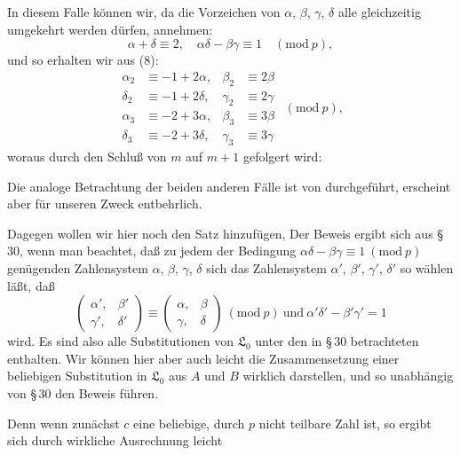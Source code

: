 
In diesem Falle können wir, da die Vorzeichen von $\alpha$, $\beta$,
$\gamma$, $\delta$ alle gleichzeitig umgekehrt werden dürfen, annehmen:
\[
\alpha+\delta\equiv 2, \quad \alpha\delta-\beta\gamma\equiv 1 \quad (\mathrm{mod}\ p),
\]
und so erhalten wir aus (8):
\[
\begin{aligned}
\alpha_2 &\equiv -1+2\alpha, & \beta_2 &\equiv 2\beta\\
\delta_2 &\equiv -1+2\delta, & \gamma_2 &\equiv 2\gamma\\
\alpha_3 &\equiv -2+3\alpha, & \beta_3 &\equiv 3\beta\\
\delta_3 &\equiv -2+3\delta, & \gamma_3 &\equiv 3\gamma
\end{aligned}\ \ (\mathrm{mod}\ p),
\]
woraus durch den Schluß von $m$ auf $m+1$ gefolgert wird:

Die analoge Betrachtung der beiden anderen Fälle ist von
 durchgeführt, erscheint aber für unseren Zweck entbehrlich.

Dagegen wollen wir hier noch den Satz hinzufügen, 
Der Beweis ergibt sich aus \S\,30, wenn man beachtet, daß
zu jedem der Bedingung $\alpha\delta-\beta\gamma\equiv 1\ (\mathrm{mod}\ p)$ genügenden
Zahlensystem $\alpha$, $\beta$, $\gamma$, $\delta$ sich das Zahlensystem $\alpha'$, $\beta'$, $\gamma'$, $\delta'$ so
wählen läßt, daß
\[
\begin{pmatrix}\alpha', & \beta'\\ \gamma', & \delta'\end{pmatrix} \equiv \begin{pmatrix}\alpha, & \beta\\ \gamma, & \delta\end{pmatrix}\ (\mathrm{mod}\ p) \ \text{und}\ \alpha'\delta'-\beta'\gamma'=1
\]
wird. Es sind also alle Substitutionen von $\mathfrak{L}_0$ unter den in \S\,30
betrachteten enthalten. Wir können hier aber auch leicht die
Zusammensetzung einer beliebigen Substitution in $\mathfrak{L}_0$ aus $A$ und
$B$ wirklich darstellen, und so unabhängig von \S\,30 den Beweis
führen.

Denn wenn zunächst $c$ eine beliebige, durch $p$ nicht teilbare
Zahl ist, so ergibt sich durch wirkliche Ausrechnung leicht
